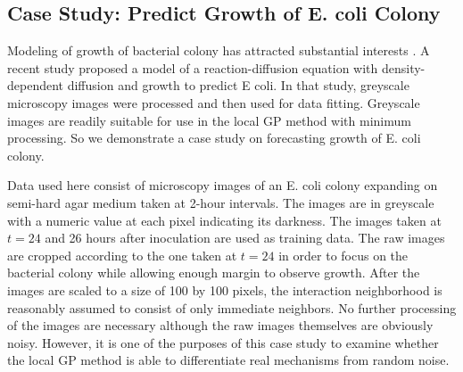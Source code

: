 \documentclass[smallextended,natbib]{svjour3}       %
\begin{document}
\subsection{Case Study: Predict Growth of E. coli Colony} 
Modeling of growth of bacterial colony has attracted substantial interests \citep{mimura2000reaction,kawasaki1997modeling,leyva2013effects}. A recent study \citep{he2020predictive} proposed a model of a reaction-diffusion equation with density-dependent diffusion and growth to predict E coli. In that study, greyscale microscopy images were processed and then used for data fitting. Greyscale images are readily suitable for use in the local GP method with minimum processing. So we demonstrate a case study on forecasting growth of E. coli colony.

Data used here consist of microscopy images of an E. coli colony expanding on semi-hard agar medium taken at 2-hour intervals. The images are in greyscale with a numeric value at each pixel indicating its darkness. The images taken at $t=24$ and 26 hours after inoculation are used as training data. The raw images are cropped  according to the one taken at $t=24$ in order to focus on the bacterial colony while allowing enough margin to observe growth. After the images are scaled to a size of 100 by 100 pixels, the interaction neighborhood is reasonably assumed to consist of only immediate neighbors. No further processing of the images are necessary although the raw images themselves are obviously noisy. However, it is one of the purposes of this case study to examine whether the local GP method is able to differentiate real mechanisms from random noise.
\end{document}
